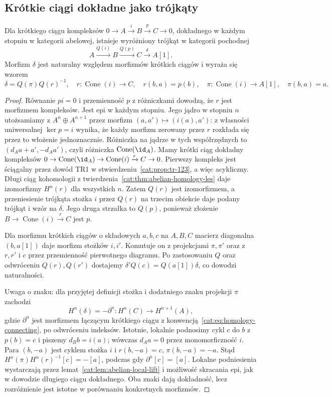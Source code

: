 \subsection{Krótkie ciągi dokładne jako trójkąty}
\begin{twierdzenie}\label{cat:thm:ses-derived-triangle}
Dla krótkiego ciągu kompleksów $0\to A\xrightarrow i B\xrightarrow p C\to0$, dokładnego w każdym stopniu w kategorii abelowej, istnieje wyróżniony trójkąt w kategorii pochodnej
\[
 A\xrightarrow{Q(i)}B\xrightarrow{Q(p)}C\xrightarrow{\delta}A[1].
\]
Morfizm $\delta$ jest naturalny względem morfizmów krótkich ciągów i wyraża się wzorem
\[
 \delta=Q(\pi)Q(r)^{-1},\quad
 r:\operatorname{Cone}(i)\to C,\quad r(b,a)=p(b),\quad
 \pi:\operatorname{Cone}(i)\to A[1],\quad \pi(b,a)=a.
\]
\end{twierdzenie}
\begin{proof}
Równanie $pi=0$ i przemienność $p$ z różniczkami dowodzą, że $r$ jest morfizmem kompleksów. Jest epi w każdym stopniu. Jego jądro w stopniu $n$ utożsamiamy z $A^n\oplus A^{n+1}$ przez morfizm $(a,a')\mapsto(i(a),a')$: z własności uniwersalnej $\ker p=i$ wynika, że każdy morfizm zerowany przez $r$ rozkłada się przez to włożenie jednoznacznie. Różniczka na jądrze w tych współrzędnych to $(d_Aa+a',-d_Aa')$, czyli różniczka $\operatorname{Cone}(\id_A)$. Mamy krótki ciąg dokładny kompleksów $0\to\operatorname{Cone}(\id_A)\to\operatorname{Cone}(i)\xrightarrow r C\to0$. Pierwszy kompleks jest ściągalny przez dowód TR1 w stwierdzeniu~\ref{cat:prop:tr-123}, a więc acykliczny. Długi ciąg kohomologii z twierdzenia~\ref{cat:thm:abelian-homology-les} daje izomorfizmy $H^n(r)$ dla wszystkich $n$. Zatem $Q(r)$ jest izomorfizmem, a przeniesienie trójkąta stożka $i$ przez $Q(r)$ na trzecim obiekcie daje podany trójkąt i wzór na $\delta$. Jego druga strzałka to $Q(p)$, ponieważ złożenie $B\to\operatorname{Cone}(i)\xrightarrow r C$ jest $p$.

Dla morfizmu krótkich ciągów o składowych $a,b,c$ na $A,B,C$ macierz diagonalna $(b,a[1])$ daje morfizm stożków $i,i'$. Komutuje on z projekcjami $\pi,\pi'$ oraz z $r,r'$ i $c$ przez przemienność pierwotnego diagramu. Po zastosowaniu $Q$ oraz odwróceniu $Q(r),Q(r')$ dostajemy $\delta'Q(c)=Q(a[1])\delta$, co dowodzi naturalności.

Uwaga o znaku: dla przyjętej definicji stożka i dodatniego znaku projekcji $\pi$ zachodzi
\[
 H^n(\delta)=-\partial^n:H^n(C)\to H^{n+1}(A),
\]
gdzie $\partial^n$ jest morfizmem łączącym krótkiego ciągu z konwencją~\eqref{cat:eq:homology-connecting}, po odwróceniu indeksów. Istotnie, lokalnie podnosimy cykl $c$ do $b$ z $p(b)=c$ i piszemy $d_Bb=i(a)$; wówczas $d_Aa=0$ przez monomorficzność $i$. Para $(b,-a)$ jest cyklem stożka $i$ i $r(b,-a)=c$, $\pi(b,-a)=-a$. Stąd $H^n(\pi)H^n(r)^{-1}[c]=-[a]$, podczas gdy $\partial^n[c]=[a]$. Lokalne podniesienia wystarczają przez lemat~\ref{cat:lem:abelian-local-lift} i możliwość skracania epi, jak w dowodzie długiego ciągu dokładnego. Oba znaki dają dokładność, lecz rozróżnienie jest istotne w porównaniu konkretnych morfizmów.
\end{proof}
